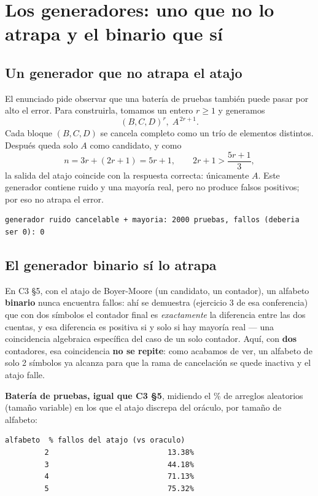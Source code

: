 \documentclass[11pt]{article}
\begin{document}
\section{Los generadores: uno que no lo atrapa y el binario que sí}

\subsection*{Un generador que no atrapa el atajo}

El enunciado pide observar que una batería de pruebas también puede pasar por alto el error. Para construirla,
tomamos un entero $r\ge1$ y generamos
\[
(B,C,D)^r,\; A^{\,2r+1}.
\]
Cada bloque $(B,C,D)$ se cancela completo como un trío de elementos distintos. Después queda solo $A$ como
candidato, y como
\[
n=3r+(2r+1)=5r+1,\qquad 2r+1>\frac{5r+1}{3},
\]
la salida del atajo coincide con la respuesta correcta: únicamente $A$. Este generador contiene ruido y una
mayoría real, pero no produce falsos positivos; por eso no atrapa el error.

\begin{lstlisting}[style=salida]
generador ruido cancelable + mayoria: 2000 pruebas, fallos (deberia ser 0): 0
\end{lstlisting}

\subsection*{El generador binario sí lo atrapa}

En C3 §5, con el atajo de Boyer-Moore (un candidato, un contador), un alfabeto \textbf{binario} nunca
encuentra fallos: ahí se demuestra (ejercicio 3 de esa conferencia) que con dos símbolos el contador final
es \emph{exactamente} la diferencia entre las dos cuentas, y esa diferencia es positiva si y solo si hay
mayoría real --- una coincidencia algebraica específica del caso de un solo contador. Aquí, con
\textbf{dos} contadores, esa coincidencia \textbf{no se repite}: como acabamos de ver, un alfabeto de solo
2 símbolos ya alcanza para que la rama de cancelación se quede inactiva y el atajo falle.

\textbf{Batería de pruebas, igual que C3 §5}, midiendo el \% de arreglos aleatorios (tamaño variable) en
los que el atajo discrepa del oráculo, por tamaño de alfabeto:

\begin{lstlisting}[style=salida]
  alfabeto  % fallos del atajo (vs oraculo)
         2                           13.38%
         3                           44.18%
         4                           71.13%
         5                           75.32%
\end{lstlisting}
\end{document}
